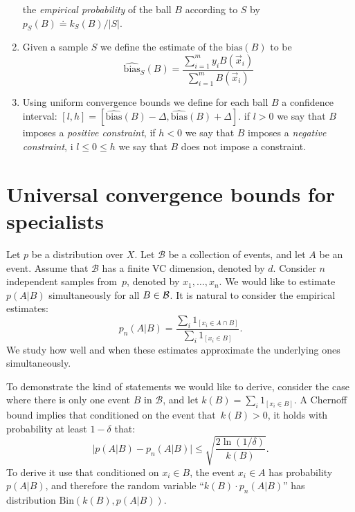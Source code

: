 \documentclass{article}
\newcommand{\B}{{\cal B}}
\newcommand{\x}{\vec{x}}
\newcommand{\cB}{\mathcal{B}}
\newcommand{\bias}{\text{bias}}
\newcommand{\ebias}{\widehat{\text{bias}}}
\newcommand{\samp}{S}
\newcommand{\comment}[3]{\marginpar{\textcolor{#2}{#1: #3}}}
\newcommand{\yoav}[1]{\comment{Yoav}{blue}{#1}}
\begin{document}
\begin{enumerate}
    the {\em empirical probability} of the ball $B$ according to
    $\samp$ by $p_{\samp}(B) \doteq k_{\samp}(B)/|\samp|$.
  \item Given a sample $\samp$ we define the estimate of the
    $\bias(B)$ to be
    \[
    \ebias_{\samp}(B) = \frac{\sum_{i=1}^m y_i B(\x_i)}{\sum_{i=1}^m B(\x_i)}
    \]
  \item Using uniform convergence bounds we define for each ball $B$
    a confidence interval:
    $[l,h]=[\ebias(B)-\Delta,\ebias(B)+\Delta]$.
    if $l>0$ we say that $B$ imposes a {\em positive constraint}, if
    $h<0$ we say that $B$ imposes a {\em negative constraint}, i
    $l\leq 0 \leq h$ we say that $B$ does not impose a constraint.
\end{enumerate}

\section{Universal convergence bounds for specialists}
\label{sec:convergence-bounds}

\yoav{I think that stating using the general term $A$ is an event,
  rather than the more problem specific $y=+1$ is confusing. I like
  the discussion but I would like to shorten it and not use ``too good
  to be true'' non-theorems.}

Let $p$ be a distribution over $X$.
Let $\cB$ be a collection of events, and let $A$ be an event.
Assume that $\cB$ has a finite VC dimension, denoted by $d$.
Consider $n$ independent samples from~$p$, denoted by $x_1,\ldots,x_n$.
We would like to estimate $p(A \vert B)$ simultaneously for all $B\in \B$.
It is natural to consider the empirical estimates:
\[p_n(A\vert B)=\frac{\sum_i 1_{[x_i\in A \cap B]}}{\sum_i 1_{[x_i\in B]}}.\]
We study how well and when these estimates approximate the underlying ones simultaneously.

To demonstrate the kind of statements we would like to derive,
consider the case where there is only one event $B$ in $\cB$, 
and let $k(B)=\sum_i 1_{[x_i\in B]}$.
A Chernoff bound implies that conditioned on the event that~$k(B)>0$, 
it holds with probability at least $1-\delta$ that:
\begin{equation}\label{eq:chernoff}
\bigl\lvert p(A\vert B) - p_n(A \vert B) \bigr\rvert \leq \sqrt{\frac{2\ln(1/\delta)}{k(B)}}.
\end{equation}
To derive it use that conditioned on $x_i\in B$, the event $x_i\in A$ has probability $p(A\vert B)$, 
and therefore the random variable ``$k(B)\cdot p_n(A \vert B)$'' has distribution $\mbox{Bin}(k(B), p(A\vert B))$.
\end{document}
